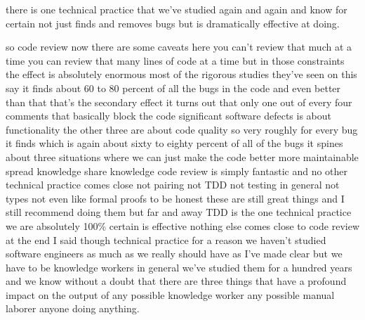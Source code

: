 \documentclass[14pt]{extreport}
\begin{document}
there is one technical practice that we've studied again and again and know for certain not just finds and removes bugs but is dramatically effective at doing.\\
\par
so code review now there are some caveats here you can't review that much at a time you can review that many lines of code at a time but in those constraints the effect is absolutely enormous most of the rigorous studies they've seen on this say it finds about 60 to 80 percent of all the bugs in the code and even better than that that's the secondary effect it turns out that only one out of every four comments that basically block the code significant software defects is about functionality the other three are about code quality so very roughly for every bug it finds which is again about sixty to eighty percent of all of the bugs it spines about three situations where we can just make the code better more maintainable spread knowledge share knowledge code review is simply fantastic and no other technical practice comes close not pairing not TDD not testing in general not types not even like formal proofs to be honest these are still great things and I still recommend doing them but far and away TDD is the one technical practice we are absolutely 100\% certain is effective nothing else comes close to code review at the end I said though technical practice for a reason we haven't studied software engineers as much as we really should have as I've made clear but we have to be knowledge workers in general we've studied them for a hundred years and we know without a doubt that there are three things that have a profound impact on the output of any possible knowledge worker any possible manual laborer anyone doing anything.
\end{document}
